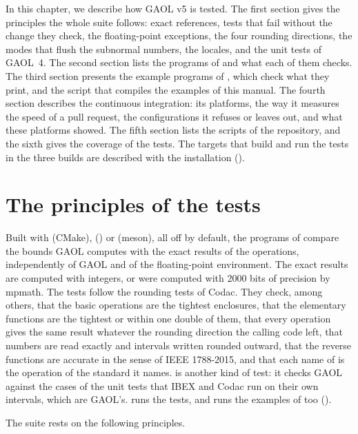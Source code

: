 \documentclass[12pt,a4paper,twoside,openright]{book}
\begin{document}
In this chapter, we describe how GAOL v5 is tested. The first section gives
the principles the whole suite follows: exact references, tests that fail
without the change they check, the floating-point exceptions, the four
rounding directions, the modes that flush the subnormal numbers, the locales,
and the unit tests of GAOL~4. The second section lists the programs of
 and what each of them checks. The third section presents the
example programs of , which check what they print, and the
script that compiles the examples of this manual. The fourth section
describes the continuous integration: its platforms, the way it measures the
speed of a pull request, the configurations it refuses or leaves out, and
what these platforms showed. The fifth section lists the scripts of the
repository, and the sixth gives the coverage of the tests. The targets that
build and run the tests in the three builds are described with the
installation ().

\section{The principles of the tests}\label{sec:test-principles}
%

Built with  (CMake), 
() or  (meson), all off by default, the
programs of  compare the bounds GAOL computes with the exact
results of the operations, independently of GAOL and of the floating-point
environment. The exact results are computed with integers, or were computed
with 2000 bits of precision by mpmath. The tests follow the rounding tests
of Codac. They check, among others, that the basic operations are the
tightest enclosures, that the elementary functions are the tightest or
within one double of them, that every operation gives the same result
whatever the rounding direction the calling code left, that numbers are read
exactly and intervals written rounded outward, that the reverse functions
are accurate in the sense of IEEE 1788-2015, and that each name of
 is the operation of the standard it names.
 is another kind of test: it checks GAOL against the
cases of the unit tests that IBEX and Codac run on their own intervals,
which are GAOL's.  runs the tests, and  runs
the examples of  too ().

\medskip
The suite rests on the following principles.
\end{document}
